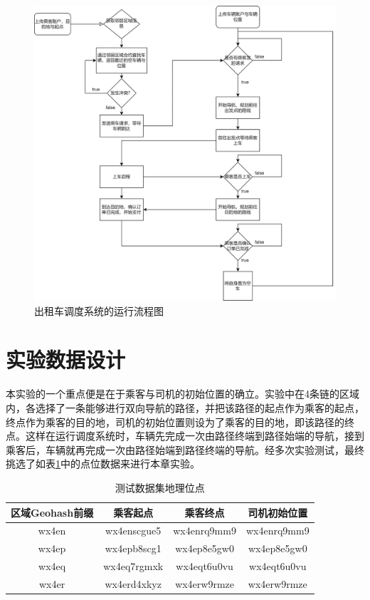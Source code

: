\begin{figure}
	\centering
	\includegraphics[width=\textwidth]{figures/出租车调度系统的运行流程图.png}
	\caption{出租车调度系统的运行流程图}
	\label{fig:出租车调度系统的运行流程图}
\end{figure}

\section{实验数据设计}

本实验的一个重点便是在于乘客与司机的初始位置的确立。实验中在4条链的区域内，各选择了一条能够进行双向导航的路径，并把该路径的起点作为乘客的起点，终点作为乘客的目的地，司机的初始位置则设为了乘客的目的地，即该路径的终点。这样在运行调度系统时，车辆先完成一次由路径终端到路径始端的导航，接到乘客后，车辆就再完成一次由路径始端到路径终端的导航。经多次实验测试，最终挑选了如表\ref{测试数据集地理位点}中的点位数据来进行本章实验。

\begin{table}
    \centering
    \caption{测试数据集地理位点}\label{测试数据集地理位点}
    \begin{tabular}{cccc} \toprule
        区域Geohash前缀 & 乘客起点        & 乘客终点        & 司机初始位置      \\    \midrule
        wx4en       & wx4enscgue5 & wx4enrq9mm9 & wx4enrq9mm9 \\
        wx4ep       & wx4epb8scg1 & wx4ep8e5gw0 & wx4ep8e5gw0 \\
        wx4eq       & wx4eq7rgmxk & wx4eqt6u0vu & wx4eqt6u0vu \\
        wx4er       & wx4erd4xkyz & wx4erw9rmze & wx4erw9rmze \\
        \bottomrule
    \end{tabular}
\end{table}

